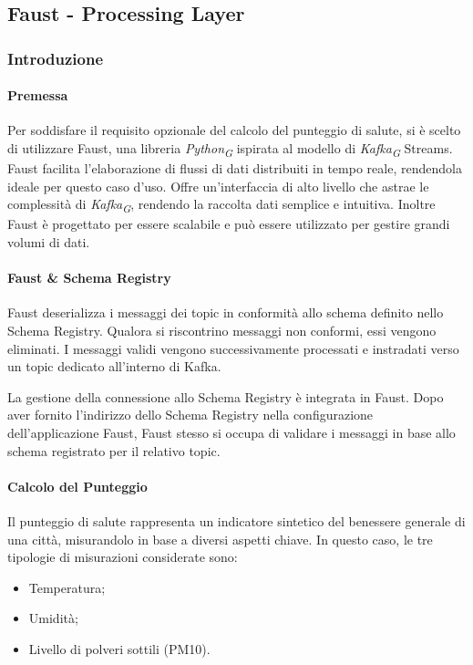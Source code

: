 \subsection{Faust - Processing Layer} \label{sec:faust}
\subsubsection{Introduzione}
\paragraph*{Premessa} 

Per soddisfare il requisito opzionale del calcolo del punteggio di salute, si è scelto di utilizzare Faust, una libreria \textit{Python}\textsubscript{\textit{G}} ispirata al modello di \textit{Kafka}\textsubscript{\textit{G}} Streams. Faust facilita l'elaborazione di flussi di dati distribuiti in tempo reale, rendendola ideale per questo caso d'uso.
Offre un'interfaccia di alto livello che astrae le complessità di \textit{Kafka}\textsubscript{\textit{G}}, rendendo la raccolta dati semplice e intuitiva.
Inoltre Faust è progettato per essere scalabile e può essere utilizzato per gestire grandi volumi di dati.

\paragraph*{Faust \& Schema Registry} 
Faust deserializza i messaggi dei topic in conformità allo schema definito nello Schema Registry. Qualora si riscontrino messaggi non conformi, essi vengono eliminati. I messaggi validi vengono successivamente processati e instradati verso un topic dedicato all'interno di Kafka.

La gestione della connessione allo Schema Registry è integrata in Faust. Dopo aver fornito l'indirizzo dello Schema Registry nella configurazione dell'applicazione Faust, Faust stesso si occupa di validare i messaggi in base allo schema registrato per il relativo topic.

\paragraph*{Calcolo del Punteggio}
Il punteggio di salute rappresenta un indicatore sintetico del benessere generale di una città, misurandolo in base a diversi aspetti chiave. In questo caso, le tre tipologie di misurazioni considerate sono:
\begin{itemize}
    \item Temperatura;
    \item Umidità;
    \item Livello di polveri sottili (PM10).
\end{itemize}

